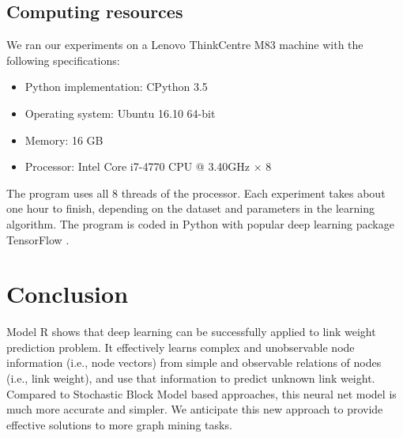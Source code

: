 \documentclass[conference]{IEEEtran}
\begin{document}
\subsection{Computing resources}
We ran our experiments on a Lenovo ThinkCentre M83 machine with the following specifications:
\begin{itemize}
	\item Python implementation: CPython 3.5
	\item Operating system: Ubuntu 16.10 64-bit
	\item Memory: 16 GB
	\item Processor: Intel Core i7-4770 CPU @ 3.40GHz $ \times $ 8
\end{itemize}
The program uses all 8 threads of the processor.
Each experiment takes about one hour to finish,
depending on the dataset and parameters in the learning algorithm.
The program is coded in Python
with popular deep learning package TensorFlow \cite{abadi2016tensorflow}.

\section{Conclusion}
Model R shows that deep learning can be successfully applied to link weight prediction problem.
It effectively learns complex and unobservable node information (i.e., node vectors) from simple and observable relations of nodes (i.e., link weight),
and use that information to predict unknown link weight.
Compared to Stochastic Block Model based approaches,
this neural net model is much more accurate and simpler.
We anticipate this new approach to provide effective solutions to more
graph mining tasks.



\end{document}

